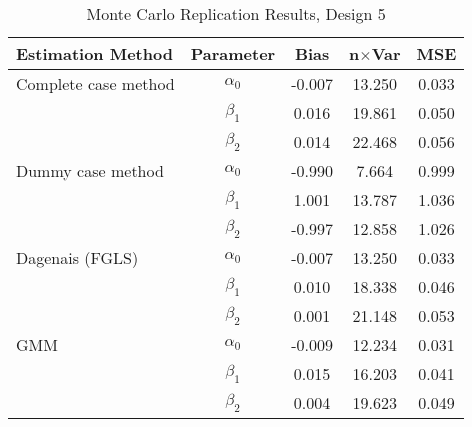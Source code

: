 \begin{table}
\centering
\caption{Monte Carlo Replication Results, Design 5}
\label{table:MCReplicationResultsDesign5}
\begin{tabular}{lcccc}
\toprule
Estimation Method & Parameter & Bias & n$\times$Var & MSE \\
\midrule
Complete case method & $\alpha_0$ & -0.007 & 13.250 & 0.033 \\
 & $\beta_1$ & 0.016 & 19.861 & 0.050 \\
 & $\beta_2$ & 0.014 & 22.468 & 0.056 \\
Dummy case method & $\alpha_0$ & -0.990 & 7.664 & 0.999 \\
 & $\beta_1$ & 1.001 & 13.787 & 1.036 \\
 & $\beta_2$ & -0.997 & 12.858 & 1.026 \\
Dagenais (FGLS) & $\alpha_0$ & -0.007 & 13.250 & 0.033 \\
 & $\beta_1$ & 0.010 & 18.338 & 0.046 \\
 & $\beta_2$ & 0.001 & 21.148 & 0.053 \\
GMM & $\alpha_0$ & -0.009 & 12.234 & 0.031 \\
 & $\beta_1$ & 0.015 & 16.203 & 0.041 \\
 & $\beta_2$ & 0.004 & 19.623 & 0.049 \\
\bottomrule
\end{tabular}
\end{table}
